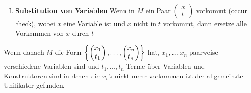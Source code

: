 \documentclass{scrreprt}
\begin{document}
\begin{enumerate}[(a)]
\begin{enumerate}[(I)]
  \label{uni:4}
  \item \textbf{Substitution von Variablen} Wenn in $M$ ein Paar
    $\begin{pmatrix}x\\t\end{pmatrix}$ vorkommt (occur check), wobei $x$ eine Variable ist und
    $x$ nicht in $t$ vorkommt, dann ersetze alle Vorkommen von $x$ durch $t$
  \end{enumerate}

  Wenn danach $M$ die Form $\qty{
    \begin{pmatrix}x_1\\t_1\end{pmatrix},
    \ldots,
    \begin{pmatrix}x_n\\t_n\end{pmatrix}
  }$ hat, $x_1, \ldots, x_n$ paarweise verschiedene Variablen sind und
  $t_1, \ldots, t_n$ Terme über Variablen und Konstruktoren sind in denen
  die $x_i$'s nicht mehr vorkommen ist der allgemeinste Unifikator gefunden.
  

\end{enumerate}
\end{document}
